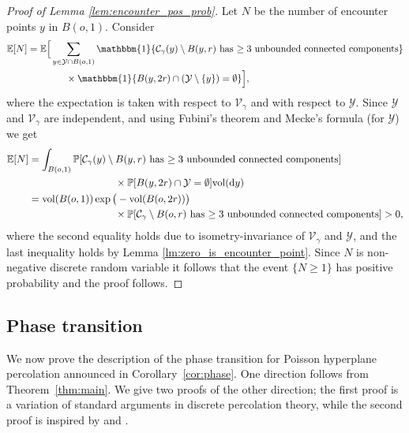 \documentclass[12pt,a4paper]{article}
\theoremstyle{definition}
\newcommand{\E}{\mathbb{E}}
\renewcommand{\P}{\mathbb{P}}
\newcommand{\dint}{{\rm d}}
\newcommand{\one}{\mathbbm{1}}
\begin{document}
\begin{proof}[Proof of Lemma \ref{lem:encounter_pos_prob}]
Let $N$ be the number of encounter points $y$ in $B(o,1)$. Consider
\begin{align*}
 \E[N]&=\E\Big[\sum_{y\in\mathcal{Y}\cap B(o,1)}\one\{\mathcal{C}_{\gamma}(y)\setminus B(y,r)\text{ has $\ge 3$ unbounded connected components}\}\\
 &\qquad\qquad\times \one\{B(y,2r)\cap (\mathcal{Y}\setminus \{y\})=\emptyset\}\Big],
 \end{align*}
 where the expectation is taken with respect to $\mathcal{V}_{\gamma}$ and with respect to $\mathcal{Y}$. Since $\mathcal{Y}$ and $\mathcal{V}_{\gamma}$ are independent, and using Fubini's theorem and Mecke's formula (for $\mathcal Y$) we get
 \begin{align*}
 \E[N]&=\int_{B(o,1)}\P[\mathcal{C}_{\gamma}(y)\setminus B(y,r)\text{ has $\ge 3$ unbounded connected components}]\\
 &\hspace{3cm}\times\P[B(y,2r)\cap \mathcal{Y}=\emptyset]{\rm vol}(\dint y)\\
 &= {\rm vol}(B(o,1))\exp\big(-{\rm vol}(B(o,2r))\big)\\
 &\hspace{3cm}\times\P[\mathcal{C}_{\gamma}\setminus B(o,r)\text{ has $\ge 3$ unbounded connected components}]>0,
\end{align*}
where the second equality holds due to isometry-invariance of $\mathcal{V}_{\gamma}$ and $\mathcal{Y}$, and the last inequality holds by Lemma \ref{lm:zero_is_encounter_point}. Since $N$ is non-negative discrete random variable it follows that the event $\{N\ge 1\}$ has positive probability and the proof follows.
\end{proof}



\subsection{Phase transition}

We now prove the description of the phase transition for Poisson hyperplane percolation announced in Corollary~\ref{cor:phase}. One direction follows from Theorem~\ref{thm:main}. We give two proofs of the other direction; the first proof is a variation of standard arguments in discrete percolation theory, while the second proof is inspired by \cite[Section~4]{BS01} and \cite[Theorem~8.49]{LP16}.
\end{document}
